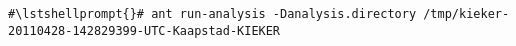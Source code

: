 \begin{lstlisting}[caption=Command to compile and run the instrumented Bookstore via ant]
#\lstshellprompt{}# ant run-analysis -Danalysis.directory /tmp/kieker-20110428-142829399-UTC-Kaapstad-KIEKER
\end{lstlisting}
